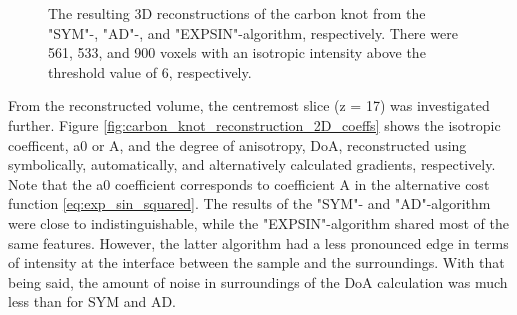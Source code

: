 \begin{figure}[h!]
    

    \caption{ The resulting 3D reconstructions of the carbon knot from the "SYM"-, "AD"-, and "EXPSIN"-algorithm, respectively.
        There were 561, 533, and 900 voxels with an isotropic intensity above the threshold value of 6, respectively.
    }
    \label{fig:carbon_knot_reconstruction_3D}
\end{figure}

\clearpage

From the reconstructed volume, the centremost slice (z = 17) was investigated further.
Figure \ref{fig:carbon_knot_reconstruction_2D_coeffs} shows the isotropic coefficent, a0 or A, and the degree of anisotropy, DoA, reconstructed using symbolically, automatically, and alternatively calculated gradients, respectively.
Note that the a0 coefficient corresponds to coefficient A in the alternative cost function \eqref{eq:exp_sin_squared}.
The results of the "SYM"- and "AD"-algorithm were close to indistinguishable,
while the "EXPSIN"-algorithm shared most of the same features.
However, the latter algorithm had a less pronounced edge in terms of intensity at the interface between the sample and the surroundings.
With that being said, the amount of noise in surroundings of the DoA calculation was much less than for SYM and AD.

